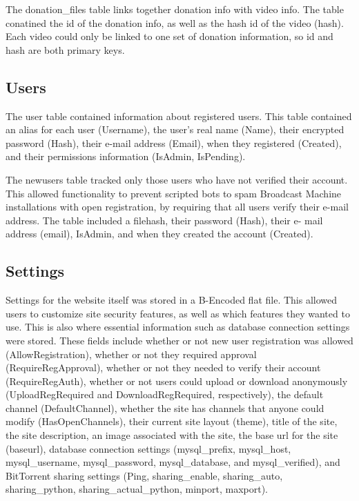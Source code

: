 \documentclass[a4paper,12pt]{report}
\begin{document}
The donation\_files table links together donation info with video info. The table conatined the id of the donation info, as well as the hash id of the video (hash). Each video could only be linked to one set of donation information, so id and hash are both primary keys.


\subsection{Users}
The user table contained information about registered users. This table contained an alias for each user (Username), the user's real name (Name), their encrypted password (Hash), their e-mail address (Email), when they registered (Created), and their permissions information (IsAdmin, IsPending). 


The newusers table tracked only those users who have not verified their account. This allowed functionality to prevent scripted bots to spam Broadcast Machine installations with open registration, by requiring that all users verify their e-mail address. The table included a filehash, their password (Hash), their e- mail address (email), IsAdmin, and when they created the account (Created).


\subsection{Settings}
Settings for the website itself was stored in a B-Encoded flat file. This allowed users to customize site security features, as well as which features they wanted to use. This is also where essential information such as database connection settings were stored. These fields include whether or not new user registration was allowed (AllowRegistration), whether or not they required approval (RequireRegApproval), whether or not they needed to verify their account (RequireRegAuth), whether or not users could upload or download anonymously (UploadRegRequired and DownloadRegRequired, respectively), the default channel (DefaultChannel), whether the site has channels that anyone could modify (HasOpenChannels), their current site layout (theme), title of the site, the site description, an image associated with the site, the base url for the site (baseurl), database connection settings (mysql\_prefix, mysql\_host, mysql\_username, mysql\_password, mysql\_database, and mysql\_verified), and BitTorrent sharing settings (Ping, sharing\_enable, sharing\_auto, sharing\_python, sharing\_actual\_python, minport, maxport).
\end{document}
